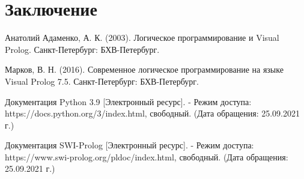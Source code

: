 \chapter*{Заключение}


\newpage

\begin{thebibliography}{3}
	Анатолий Адаменко, А. К. (2003). Логическое программирование и Visual Prolog. Санкт-Петербург: БХВ-Петербург.
	
	Марков, В. Н. (2016). Современное логическое программирование на языке Visual Prolog 7.5. Санкт-Петербург: БХВ-Петербург.
	
	Документация Python 3.9 [Электронный ресурс]. - Режим доступа: https://docs.python.org/3/index.html, свободный. (Дата обращения: 25.09.2021 г.)
	
	Документация SWI-Prolog [Электронный ресурс]. - Режим доступа: https://www.swi-prolog.org/pldoc/index.html, свободный. (Дата обращения: 25.09.2021 г.)
	
\end{thebibliography}